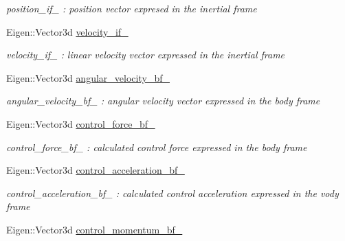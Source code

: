 \begin{DoxyCompactItemize}
\begin{DoxyCompactList}\small\item\em position\-\_\-if\-\_\- \-: position vector expresed in the inertial frame \end{DoxyCompactList}\item 
\hypertarget{class_pose_controller_node_a5de402d440e8559fb6f1fb92da6c8916}{Eigen\-::\-Vector3d \hyperlink{class_pose_controller_node_a5de402d440e8559fb6f1fb92da6c8916}{velocity\-\_\-if\-\_\-}}\label{class_pose_controller_node_a5de402d440e8559fb6f1fb92da6c8916}

\begin{DoxyCompactList}\small\item\em velocity\-\_\-if\-\_\- \-: linear velocity vector expressed in the inertial frame \end{DoxyCompactList}\item 
\hypertarget{class_pose_controller_node_a0e583298a3cb5fb771e6366274977c93}{Eigen\-::\-Vector3d \hyperlink{class_pose_controller_node_a0e583298a3cb5fb771e6366274977c93}{angular\-\_\-velocity\-\_\-bf\-\_\-}}\label{class_pose_controller_node_a0e583298a3cb5fb771e6366274977c93}

\begin{DoxyCompactList}\small\item\em angular\-\_\-velocity\-\_\-bf\-\_\- \-: angular velocity vector expressed in the body frame \end{DoxyCompactList}\item 
\hypertarget{class_pose_controller_node_a6f161bb042fe82e00243cbc81f18e8e1}{Eigen\-::\-Vector3d \hyperlink{class_pose_controller_node_a6f161bb042fe82e00243cbc81f18e8e1}{control\-\_\-force\-\_\-bf\-\_\-}}\label{class_pose_controller_node_a6f161bb042fe82e00243cbc81f18e8e1}

\begin{DoxyCompactList}\small\item\em control\-\_\-force\-\_\-bf\-\_\- \-: calculated control force expressed in the body frame \end{DoxyCompactList}\item 
\hypertarget{class_pose_controller_node_a32c89765e26c734fa42e55bfcba8aa92}{Eigen\-::\-Vector3d \hyperlink{class_pose_controller_node_a32c89765e26c734fa42e55bfcba8aa92}{control\-\_\-acceleration\-\_\-bf\-\_\-}}\label{class_pose_controller_node_a32c89765e26c734fa42e55bfcba8aa92}

\begin{DoxyCompactList}\small\item\em control\-\_\-acceleration\-\_\-bf\-\_\- \-: calculated control acceleration expressed in the vody frame \end{DoxyCompactList}\item 
\hypertarget{class_pose_controller_node_a7d8869bb930d005927889e7912e862c4}{Eigen\-::\-Vector3d \hyperlink{class_pose_controller_node_a7d8869bb930d005927889e7912e862c4}{control\-\_\-momentum\-\_\-bf\-\_\-}}\label{class_pose_controller_node_a7d8869bb930d005927889e7912e862c4}


\end{DoxyCompactItemize}
